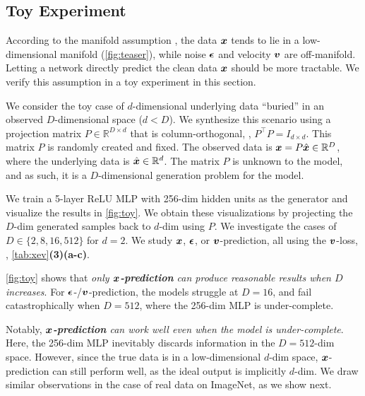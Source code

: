 \subsection{Toy Experiment}

According to the manifold assumption \cite{Chapelle2006SemiSupervised}, the data $\bm{x}$ tends to lie in a low-dimensional manifold 
(\cref{fig:teaser}), while noise $\bm{\epsilon}$ and velocity $\bm{v}$ are off-manifold. Letting a network directly predict the clean data $\bm{x}$ should be more tractable. We verify this assumption in a toy experiment in this section.

We consider the toy case of $d$-dimensional underlying data ``buried'' in an observed $D$-dimensional space ($d < D$). We synthesize this scenario using a projection matrix $P \in \mathbb{R}^{D \times d}$ that is column-orthogonal, \ie, $P^{\top} P = I_{d \times d}$. This matrix $P$ is randomly created and fixed. The observed data is $\bm{x} = P \hat{\bm{x}} \in \mathbb{R}^{D}$, where the underlying data is $\hat{\bm{x}} \in \mathbb{R}^{d}$. The matrix $P$ is unknown to the model, and as such, it is a \mbox{$D$-dimensional} generation problem for the model. 

We train a {5-layer ReLU MLP with 256-dim hidden units} as the generator and visualize the results in \cref{fig:toy}. 
We obtain these visualizations by projecting the $D$-dim generated samples back to $d$-dim using $P$. We investigate the cases of $D \in \{2, 8, 16, 512\}$ for $d=2$.
We study $\bm{x}$, $\bm{\epsilon}$, or $\bm{v}$-prediction, all using the $\bm{v}$-loss, \ie, \cref{tab:xev}\textbf{(3)(a-c)}.


\cref{fig:toy} shows that {\textit{only {\textbf{$\bm{x}$-prediction}} can produce reasonable results when $D$ increases}}. For $\bm{\epsilon}$-/$\bm{v}$-prediction, the models struggle at $D{=}16$, and fail catastrophically when $D{=}512$, where the \mbox{256-dim} MLP is under-complete.

Notably, {\textit{{\textbf{$\bm{x}$-prediction}} can work well even when the model is {under-complete}}}. Here, the 256-dim MLP inevitably discards information in the $D{=}512$-dim space. However, since the true data is in a low-dimensional $d$-dim space, $\bm{x}$-prediction can still perform well, as the ideal output is implicitly $d$-dim. We draw similar observations in the case of real data on ImageNet, as we show next.


